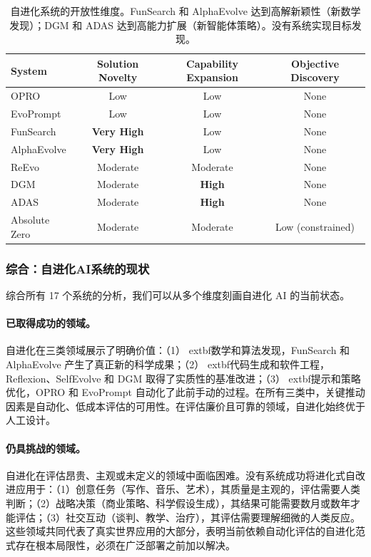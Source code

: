 \begin{table}[htbp]
\centering
\begin{tabular}{lccc}
\toprule
\textbf{System} & \textbf{Solution Novelty} & \textbf{Capability Expansion} & \textbf{Objective Discovery} \\
\midrule
OPRO & Low & Low & None \\
EvoPrompt & Low & Low & None \\
FunSearch & \textbf{Very High} & Low & None \\
AlphaEvolve & \textbf{Very High} & Low & None \\
ReEvo & Moderate & Moderate & None \\
DGM & Moderate & \textbf{High} & None \\
ADAS & Moderate & \textbf{High} & None \\
Absolute Zero & Moderate & Moderate & Low (constrained) \\
\bottomrule
\end{tabular}
\caption{自进化系统的开放性维度。FunSearch 和 AlphaEvolve 达到高解新颖性（新数学发现）；DGM 和 ADAS 达到高能力扩展（新智能体策略）。没有系统实现目标发现。}
\label{tab:openness}
\end{table}


\subsubsection{综合：自进化AI系统的现状}

综合所有 17 个系统的分析，我们可以从多个维度刻画自进化 AI 的当前状态。

\paragraph{已取得成功的领域。}
自进化在三类领域展示了明确价值：（1）	extbf{数学和算法发现}，FunSearch 和 AlphaEvolve 产生了真正新的科学成果；（2）	extbf{代码生成和软件工程}，Reflexion、SelfEvolve 和 DGM 取得了实质性的基准改进；（3）	extbf{提示和策略优化}，OPRO 和 EvoPrompt 自动化了此前手动的过程。在所有三类中，关键推动因素是自动化、低成本评估的可用性。在评估廉价且可靠的领域，自进化始终优于人工设计。

\paragraph{仍具挑战的领域。}
自进化在评估昂贵、主观或未定义的领域中面临困难。没有系统成功将进化式自改进应用于：（1）创意任务（写作、音乐、艺术），其质量是主观的，评估需要人类判断；（2）战略决策（商业策略、科学假设生成），其结果可能需要数月或数年才能评估；（3）社交互动（谈判、教学、治疗），其评估需要理解细微的人类反应。这些领域共同代表了真实世界应用的大部分，表明当前依赖自动化评估的自进化范式存在根本局限性，必须在广泛部署之前加以解决。

